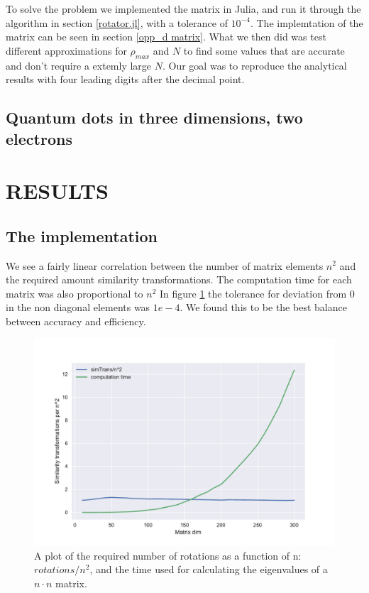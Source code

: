 \documentclass[a4paper]{article}
\begin{document}
To solve the problem we implemented the matrix in Julia, and run it through the algorithm in section \ref{rotator.jl}, with a tolerance of $10^{-4}$. The implemtation of the matrix can be seen in section \ref{opp_d matrix}. What we then did was test different approximations for $\rho_{max}$ and $N$ to find some values that are accurate and don't require a extemly large $N$. Our goal was to reproduce the analytical results with four leading digits after the decimal point.

\subsection{Quantum dots in three dimensions, two electrons}


\section{RESULTS}
\subsection{The implementation}
We see a fairly linear correlation between the number of matrix elements $n^2$ and the required amount similarity transformations. The computation time for each matrix was also proportional to $n^2$ In figure \ref{computation time plot} the tolerance for deviation from 0 in the non diagonal elements was $1e-4$. We found this to be the best balance between accuracy and efficiency. 
\begin{figure}[h!]
	\centering 
	\includegraphics[scale=0.7]{../requiredRotations.pdf}
	\caption{A plot of the required number of rotations as a function of n: $rotations/n^2$, and the time used for calculating the eigenvalues of a $n\cdot n$ matrix.}
	\label{computation time plot}
\end{figure}
\end{document}
